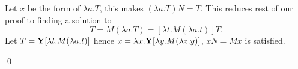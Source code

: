 \begin{pf} \rm
 Let $x$ be the form of $\lambda a.T$, this makes
 $(\lambda a.T) N = T$. This reduces rest of our proof to finding a solution to
\[
 T = M(\lambda a.T)= [ \lambda t. M(\lambda a.t) ] T.
\]
Let $T = \mathbf{Y}[\lambda t.M(\lambda a.t)]$ hence $x=\lambda x. 
\mathbf{Y}[\lambda y.M(\lambda z.y)]$, $xN=Mx$ is satisfied.


\qed
\end{pf}
